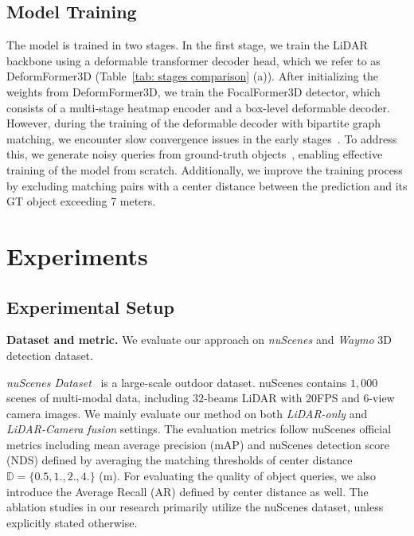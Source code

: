 \documentclass[10pt,twocolumn,letterpaper]{article}
\begin{document}
\subsection{Model Training}
\label{sec:training}
The model is trained in two stages. In the first stage, we train the LiDAR backbone using a deformable transformer decoder head, which we refer to as DeformFormer3D (Table~\ref{tab: stages comparison} (a)).
After initializing the weights from DeformFormer3D, we train the FocalFormer3D detector, which consists of a multi-stage heatmap encoder and a box-level deformable decoder. However, during the training of the deformable decoder with bipartite graph matching, we encounter slow convergence issues in the early stages~\cite{dndetr}. To address this, we generate noisy queries from ground-truth objects~\cite{cmt, dndetr, dino}, enabling effective training of the model from scratch. Additionally, we improve the training process by excluding matching pairs with a center distance between the prediction and its GT object exceeding 7 meters.

\section{Experiments}

\subsection{Experimental Setup}

\vspace{1mm}
\noindent\textbf{Dataset and metric.} We evaluate our approach on \textit{nuScenes} and \textit{Waymo} 3D detection dataset.

\textit{nuScenes Dataset}~\cite{nuscenes} is a large-scale outdoor dataset. nuScenes contains $1,000$ scenes of multi-modal data, including $32$-beams LiDAR with $20$FPS and $6$-view camera images. We mainly evaluate our method on both \textit{LiDAR-only} and \textit{LiDAR-Camera fusion} settings. The evaluation metrics follow nuScenes official metrics including mean average precision (mAP) and nuScenes detection score (NDS) defined by averaging the matching thresholds of center distance $\mathbb{D} = \{0.5, 1., 2., 4.\}$ (m). For evaluating the quality of object queries, we also introduce the Average Recall (AR) defined by center distance as well. The ablation studies in our research primarily utilize the nuScenes dataset, unless explicitly stated otherwise.
\end{document}
